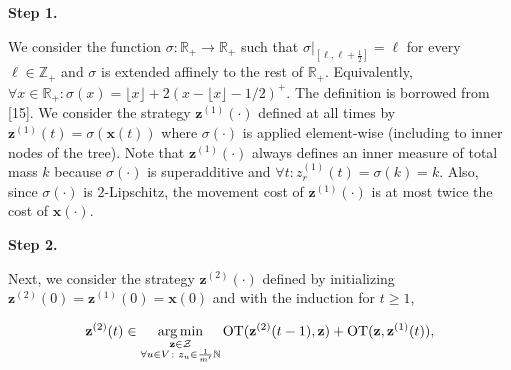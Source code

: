 \documentclass[10pt,a4paper]{article}
\begin{document}
\par\medskip\noindent\textbf{Step 1.}\par




We consider the function $\sigma\colon\mathbb{R}_{+}\rightarrow\mathbb{R}_{+}$ such that $\sigma|_{\left[\ell,\ell+\frac{1}{2}\right]}=\ell$ for every $\ell\in\mathbb{Z}_{+}$ and $\sigma$ is extended affinely to the rest of $\mathbb{R}_{+}$. Equivalently, $\forall x\in\mathbb{R}_{+}\colon\sigma(x)={\lfloor x\rfloor}+2(x-{\lfloor x\rfloor}-1/2)^{+}$. The definition is borrowed from [15]. We consider the strategy ${\mathbf{z}}^{(1)}(\cdot)$ defined at all times by ${\mathbf{z}}^{(1)}(t)=\sigma({\boldsymbol{x}}(t))$ where $\sigma(\cdot)$ is applied element-wise (including to inner nodes of the tree). Note that ${\mathbf{z}}^{(1)}(\cdot)$ always defines an inner measure of total mass $k$ because $\sigma(\cdot)$ is superadditive and $\forall t\colon z^{(1)}_{r}(t)=\sigma(k)=k$. Also, since $\sigma(\cdot)$ is $2$-Lipschitz, the movement cost of ${\mathbf{z}}^{(1)}(\cdot)$ is at most twice the cost of ${\boldsymbol{x}}(\cdot)$.\par





\par\medskip\noindent\textbf{Step 2.}\par




Next, we consider the strategy ${\mathbf{z}}^{(2)}(\cdot)$ defined by initializing ${\mathbf{z}}^{(2)}(0)={\mathbf{z}}^{(1)}(0)={\boldsymbol{x}}(0)$ and with the induction for $t\geq 1$,\par


\[\begin{gathered}
{\mathbf{z}}^{(2)}(t)\in\operatorname*{arg\,min}_{\begin{subarray}{c}{\mathbf{z}}\in\mathcal{Z}\\
\forall u\in V\colon z_{u}\in\frac{1}{m^{\prime}}\mathbb{N}\end{subarray}}\text{OT}({\mathbf{z}}^{(2)}(t-1),{\mathbf{z}})+\text{OT}({\mathbf{z}},{\mathbf{z}}^{(1)}(t)),
\end{gathered}\]
\end{document}
